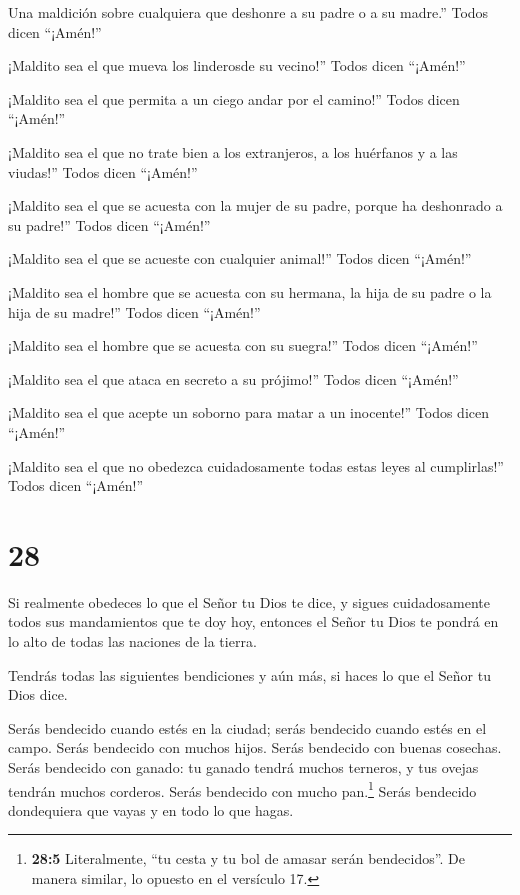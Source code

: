  Una maldición sobre cualquiera que deshonre a su padre o a
su madre.'' Todos dicen ``¡Amén!''

 ¡Maldito sea el que mueva los linderosde su vecino!''
Todos dicen ``¡Amén!''

 ¡Maldito sea el que permita a un ciego andar por el
camino!'' Todos dicen ``¡Amén!''

 ¡Maldito sea el que no trate bien a los extranjeros, a los
huérfanos y a las viudas!'' Todos dicen ``¡Amén!''

 ¡Maldito sea el que se acuesta con la mujer de su padre,
porque ha deshonrado a su padre!'' Todos dicen ``¡Amén!''

 ¡Maldito sea el que se acueste con cualquier animal!''
Todos dicen ``¡Amén!''

 ¡Maldito sea el hombre que se acuesta con su hermana, la
hija de su padre o la hija de su madre!'' Todos dicen ``¡Amén!''

 ¡Maldito sea el hombre que se acuesta con su suegra!''
Todos dicen ``¡Amén!''

 ¡Maldito sea el que ataca en secreto a su prójimo!'' Todos
dicen ``¡Amén!''

 ¡Maldito sea el que acepte un soborno para matar a un
inocente!'' Todos dicen ``¡Amén!''

 ¡Maldito sea el que no obedezca cuidadosamente todas estas
leyes al cumplirlas!'' Todos dicen ``¡Amén!''

\hypertarget{section-27}{%
\section{28}\label{section-27}}

 Si realmente obedeces lo que el Señor tu Dios te dice, y
sigues cuidadosamente todos sus mandamientos que te doy hoy, entonces el
Señor tu Dios te pondrá en lo alto de todas las naciones de la tierra.

 Tendrás todas las siguientes bendiciones y aún más, si
haces lo que el Señor tu Dios dice.

 Serás bendecido cuando estés en la ciudad; serás bendecido
cuando estés en el campo.  Serás bendecido con muchos hijos.
Serás bendecido con buenas cosechas. Serás bendecido con ganado: tu
ganado tendrá muchos terneros, y tus ovejas tendrán muchos corderos.
 Serás bendecido con mucho pan.\footnote{\textbf{28:5}
  Literalmente, ``tu cesta y tu bol de amasar serán bendecidos''. De
  manera similar, lo opuesto en el versículo 17.}  Serás
bendecido dondequiera que vayas y en todo lo que hagas.

